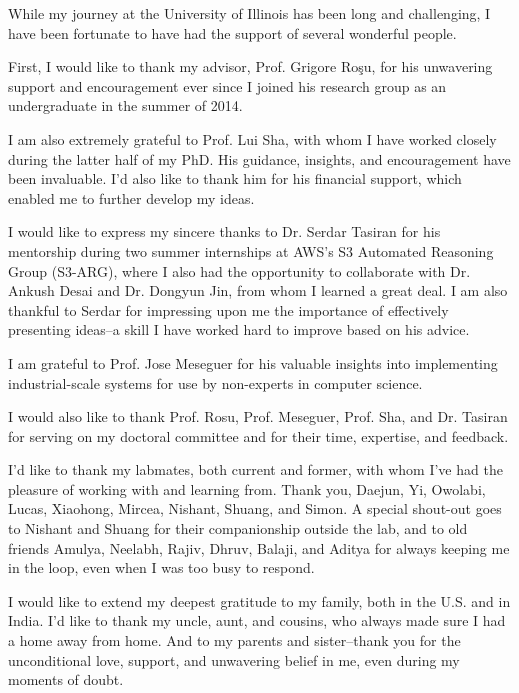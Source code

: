 \documentclass[edeposit,tocnosub,noragright,centerchapter,fullpagesingle,12pt]{uiuc_csthesis21}
\theoremstyle{definition}
\numberwithin{algocf}{chapter}     %
\begin{document}
%
\begin{acknowledgments}
While my journey at the University of Illinois has been long and challenging,
  I have been fortunate to have had the support of several wonderful people.

  First, I would like to thank my advisor, Prof. Grigore Ro\c{s}u,
  for his unwavering support and encouragement ever since I joined his research group as an undergraduate in the summer of 2014.

I am also extremely grateful to Prof. Lui Sha,
  with whom I have worked closely during the latter half of my PhD.
  His guidance, insights, and encouragement have been invaluable.
  I’d also like to thank him for his financial support, which enabled me to further develop my ideas.

I would like to express my sincere thanks to
  Dr. Serdar Tasiran for his mentorship during two summer internships at AWS’s S3 Automated Reasoning Group (S3-ARG),
  where I also had the opportunity to collaborate with Dr. Ankush Desai and Dr. Dongyun Jin,
  from whom I learned a great deal.
  I am also thankful to Serdar for impressing upon me the importance of
  effectively presenting ideas--a skill I have worked hard to improve based on his advice.

I am grateful to Prof. Jose Meseguer for his valuable insights
into implementing industrial-scale systems for use by non-experts in computer science.

I would also like to thank Prof. Rosu, Prof. Meseguer, Prof. Sha,
  and Dr. Tasiran for serving on my doctoral committee and for their time, expertise, and feedback.

I’d like to thank my labmates,
  both current and former, with whom I’ve had the pleasure of working with and learning from.
  Thank you, Daejun, Yi, Owolabi, Lucas, Xiaohong, Mircea, Nishant, Shuang, and Simon.
  A special shout-out goes to Nishant and Shuang for their companionship outside the lab,
  and to old friends Amulya, Neelabh, Rajiv, Dhruv, Balaji, and Aditya for always keeping me in the loop,
  even when I was too busy to respond.

I would like to extend my deepest gratitude to my family,
  both in the U.S. and in India.
I'd like to thank my uncle, aunt, and cousins, who always made sure I had a home away from home.
And to my parents and sister--thank you for the unconditional love, support, and unwavering belief in me, even during my moments of doubt.

\end{acknowledgments}
\end{document}
